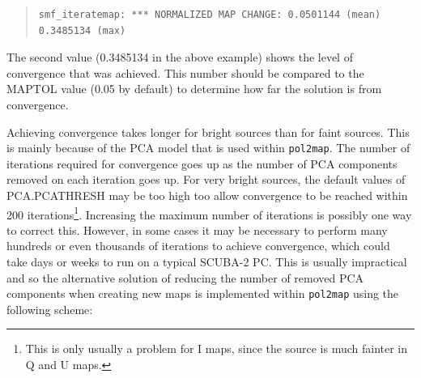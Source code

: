 \documentclass[twoside,11pt]{starlink}
\begin{document}
\begin{quote}
\begin{verbatim}
smf_iteratemap: *** NORMALIZED MAP CHANGE: 0.0501144 (mean) 0.3485134 (max)
\end{verbatim}
\end{quote}

The second value (0.3485134 in the above example) shows the level of
convergence that was achieved. This number should be compared to the
MAPTOL value (0.05 by default) to determine how far the solution is from
convergence.

Achieving convergence takes longer for bright sources than for faint
sources. This is mainly because of the PCA model that is used within
\texttt{pol2map}. The number of iterations required for convergence goes
up as the number of PCA components removed on each iteration goes up. For
very bright sources, the default values of PCA.PCATHRESH may be too high
too allow convergence to be reached within 200 iterations\footnote{This
is only usually a problem for I maps, since the source is much fainter in
Q and U maps.}. Increasing the maximum number of iterations is possibly
one way to correct this. However, in some cases it may be necessary to
perform many hundreds or even thousands of iterations to achieve
convergence, which could take days or weeks to run on a typical SCUBA-2
PC. This is usually impractical and so the alternative solution of
reducing the number of removed PCA components when creating new maps is
implemented within \texttt{pol2map} using the following scheme:
\end{document}
